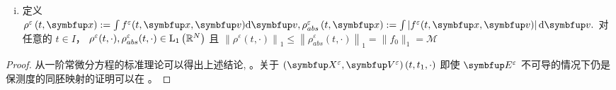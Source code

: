 \begin{lemma}
\begin{enumerate}[(i)]
\item  定义 $\rho^{\varepsilon}\left(t, \vx\right):=\int f^{\varepsilon}(t, \vx, \vv) \mathrm{d} \vv,\rho^{\varepsilon}_{abs}\left(t, \vx\right):=\int\left|f^{\varepsilon}(t, \vx, \vv)\right| \mathrm{d} \vv .$ 
对任意的 $t \in I$， $\rho^{\varepsilon}(t, \cdot),\rho_{abs}^{\varepsilon}(t, \cdot) \in \mathrm{L}_{1}\left({\mathbb{R}}^{N}\right)$ 且
$\left\|\rho^{\varepsilon}(t, \cdot)\right\|_{1} \leqslant\left\|\rho^{\varepsilon}_{abs}(t, \cdot)\right\|_{1}=\|f_{0}\|_{1}=\mathcal{M}$ %

\end{enumerate}
\end{lemma}

\begin{proof}
    从一阶常微分方程的标准理论可以得出上述结论, \cite[pp. 131]{hartman2002ordinary}。关于 $(\vect{X}^{\varepsilon},\vect{V}^{\varepsilon})\left(t, t_{1}, \cdot\right)$ 即使 $\vE^{\varepsilon}$ 不可导的情况下仍是保测度的同胚映射的证明可以在 \cite[pp. 62]{batt1962fixpunktprobleme}。%
\end{proof}



